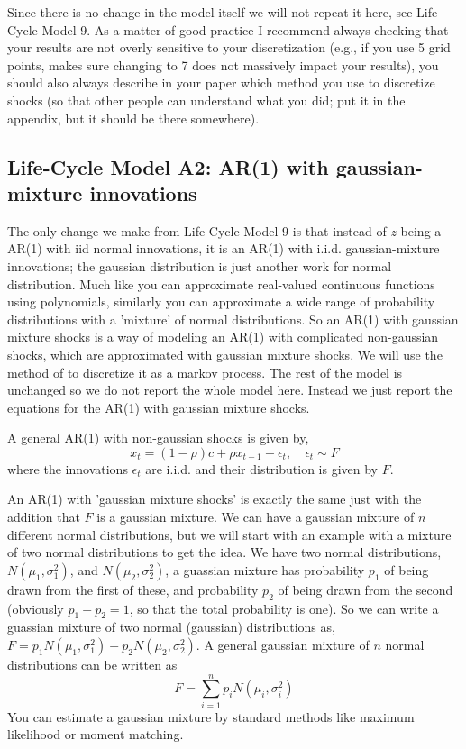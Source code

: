 Since there is no change in the model itself we will not repeat it here, see Life-Cycle Model 9. As a matter of good practice I recommend always checking that your results are not overly sensitive to your discretization (e.g., if you use 5 grid points, makes sure changing to 7 does not massively impact your results), you should also always describe in your paper which method you use to discretize shocks (so that other people can understand what you did; put it in the appendix, but it should be there somewhere).

\subsection{Life-Cycle Model A2: AR(1) with gaussian-mixture innovations}
The only change we make from Life-Cycle Model 9 is that instead of $z$ being a AR(1) with iid normal innovations, it is an AR(1) with i.i.d. gaussian-mixture innovations; the gaussian distribution is just another work for normal distribution. Much like you can approximate real-valued continuous functions using polynomials, similarly you can approximate a wide range of probability distributions with a 'mixture' of normal distributions. So an AR(1) with gaussian mixture shocks is a way of modeling an AR(1) with complicated non-gaussian shocks, which are approximated with gaussian mixture shocks. We will use the method of \cite*{FarmerToda2017} to discretize it as a markov process. The rest of the model is unchanged so we do not report the whole model here. Instead we just report the equations for the AR(1) with gaussian mixture shocks.

A general AR(1) with non-gaussian shocks is given by,
\begin{equation*}
 x_t=(1-\rho)c + \rho x_{t-1} + \epsilon_t, \quad \epsilon_t \sim F
\end{equation*}
where the innovations $\epsilon_t$ are i.i.d. and their distribution is given by $F$.

An AR(1) with 'gaussian mixture shocks' is exactly the same just with the addition that $F$ is a gaussian mixture. We can have a gaussian mixture of $n$ different normal distributions, but we will start with an example with a mixture of two normal distributions to get the idea. We have two normal distributions, $N(\mu_1, \sigma_1^2)$, and $N(\mu_2,\sigma_2^2)$, a guassian mixture has probability $p_1$ of being drawn from the first of these, and probability $p_2$ of being drawn from the second (obviously $p_1+p_2=1$, so that the total probability is one). So we can write a guassian mixture of two normal (gaussian) distributions as, $F=p_1 N(\mu_1, \sigma_1^2)+p_2 N(\mu_2,\sigma_2^2)$. A general gaussian mixture of $n$ normal distributions can be written as
\begin{equation*}
F= \sum_{i=1}^n p_i N(\mu_i,\sigma_i^2)
\end{equation*}
You can estimate a gaussian mixture by standard methods like maximum likelihood or moment matching.

